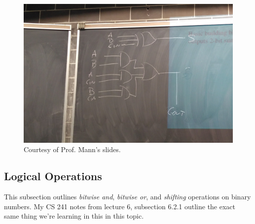 \documentclass{report}
\begin{document}
\begin{figure}[ht]
\begin{center}
\includegraphics[scale=0.13]{circuit.jpg}
\end{center}
\caption{Courtesy of Prof. Mann's slides.}
\end{figure}\newpage
\subsection{Logical Operations}
This subsection outlines \textit{bitwise and}, \textit{bitwise or}, and \textit{shifting} operations on binary numbers. My CS 241 notes from lecture 6, subsection 6.2.1 outline the exact same thing we're learning in this in this topic.
\end{document}
